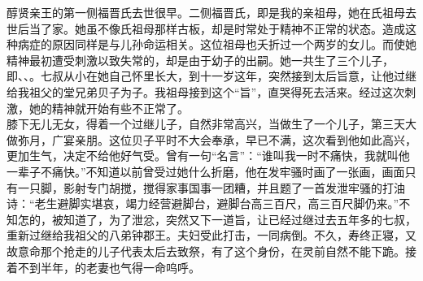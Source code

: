 醇贤亲王的第一侧福晋氏去世很早。二侧福晋氏，即是我的亲祖母，她在氏祖母去世后当了家。她虽不像氏祖母那样古板，却是时常处于精神不正常的状态。造成这种病症的原因同样是与儿孙命运相关。这位祖母也夭折过一个两岁的女儿。而使她精神最初遭受刺激以致失常的，却是由于幼子的出嗣。她一共生了三个儿子，即、、。七叔从小在她自己怀里长大，到十一岁这年，突然接到太后旨意，让他过继给我祖父的堂兄弟贝子为子。我祖母接到这个“旨”，直哭得死去活来。经过这次刺激，她的精神就开始有些不正常了。\\

膝下无儿无女，得着一个过继儿子，自然非常高兴，当做生了一个儿子，第三天大做弥月，广宴亲朋。这位贝子平时不大会奉承，早已不满，这次看到他如此高兴，更加生气，决定不给他好气受。曾有一句“名言”：“谁叫我一时不痛快，我就叫他一辈子不痛快。”不知道以前曾受过她什么折磨，他在发牢骚时画了一张画，画面只有一只脚，影射专门胡搅，搅得家事国事一团糟，并且题了一首发泄牢骚的打油诗：“老生避脚实堪哀，竭力经营避脚台，避脚台高三百尺，高三百尺脚仍来。”不知怎的，被知道了，为了泄忿，突然又下一道旨，让已经过继过去五年多的七叔，重新过继给我祖父的八弟钟郡王。夫妇受此打击，一同病倒。不久，寿终正寝，又故意命那个抢走的儿子代表太后去致祭，有了这个身份，在灵前自然不能下跪。接着不到半年，的老妻也气得一命呜呼。\\

